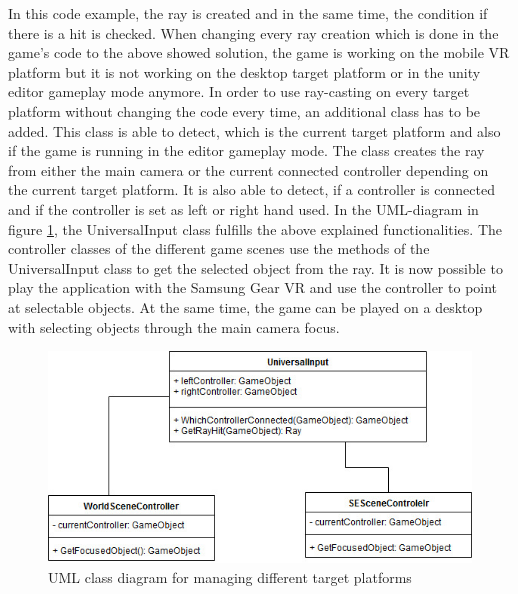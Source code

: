 In this code example, the ray is created and in the same time, the condition if there is a hit is checked.
When changing every ray creation which is done in the game's code to the above showed solution, the game is working on the mobile VR platform but it is not working on the desktop target platform or in the unity editor gameplay mode anymore. In order to use ray-casting on every target platform without changing the code every time, an additional class has to be added. This class is able to detect, which is the current target platform and also if the game is running in the editor gameplay mode. The class creates the ray from either the main camera or the current connected controller depending on the current target platform. It is also able to detect, if a controller is connected and if the controller is set as left or right hand used. In the UML-diagram in figure \ref{fig:uml-universalinput}, the UniversalInput class fulfills the above explained functionalities. The controller classes of the different game scenes use the methods of the UniversalInput class to get the selected object from the ray. It is now possible to play the application with the Samsung Gear VR and use the controller to point at selectable objects. At the same time, the game can be played on a desktop with selecting objects through the main camera focus.
\begin{figure}[h!]
  \includegraphics[width=13cm]{kapitel/uml-input.jpg}
  \centering
  \caption{UML class diagram for managing different target platforms}
  \label{fig:uml-universalinput}
\end{figure}
